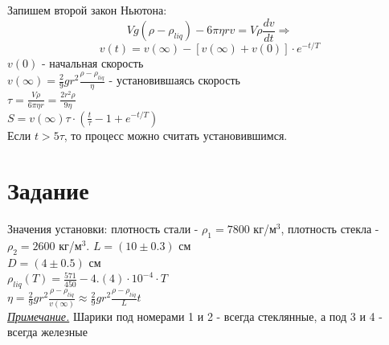 \documentclass[12 pt, a4paper]{article}%
\newcommand{\prim}{\underline{\textit{Примечание.}} }
\begin{document}
Запишем второй закон Ньютона: $$Vg(\rho - \rho_{liq}) - 6\pi \eta r v = V\rho \frac{dv}{dt} \Rightarrow$$ $$v(t) = v(\infty) - [v(\infty) + v(0)]\cdot e^{-t / T}$$ 
$v(0)$ - начальная скорость \\
$v(\infty) = \frac{2}{9} g r^2 \frac{\rho - \rho_{liq}}{\eta}$ - установившаясь скорость \\ 
$\tau = \frac{V\rho}{6\pi \eta r} = \frac{2 r^2 \rho}{9 \eta}$ \\ 
$S = v(\infty) \tau \cdot (\frac{t}{\tau} - 1 + e^{-t/T})$ \\
Если $t > 5\tau$, то процесс можно считать установившимся.
\section*{Задание}
Значения установки: плотность стали - $\rho_1 = 7800$ кг/м$^3$, плотность стекла - $\rho_2 = 2600$ кг/м$^3$.
$L = (10\pm0.3)$ см \\
$D = (4\pm0.5)$ см \\
$\rho_{liq}(T) = \frac{571}{450} - 4.(4)\cdot10^{-4} \cdot T$ \\ 
$\eta = \frac{2}{9} g r^2 \frac{\rho - \rho_{liq}}{v(\infty)} \approx \frac{2}{9} g r^2 \frac{\rho - \rho_{liq}}{L} t$ \\
\prim  Шарики под номерами 1 и 2 - всегда стеклянные, а под 3 и 4 - всегда железные
\end{document}
